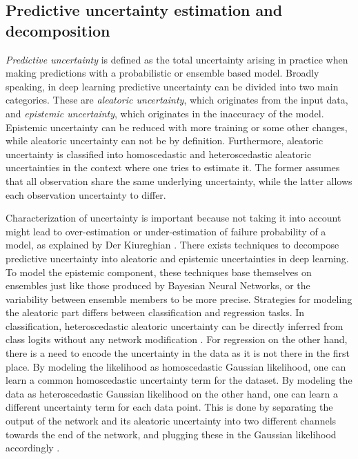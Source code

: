 \subsection{Predictive uncertainty estimation and decomposition}

\textit{Predictive uncertainty} is defined as the total uncertainty arising in practice when making predictions with a probabilistic or ensemble based model.
Broadly speaking, in deep learning predictive uncertainty can be divided into two main categories. These are  \textit{aleatoric uncertainty}, which originates from the input data, and \textit{epistemic uncertainty}, which originates in the inaccuracy of the model. Epistemic uncertainty can be reduced with more training or some other changes, while aleatoric uncertainty can not be by definition. Furthermore, aleatoric uncertainty is classified into homoscedastic and heteroscedastic aleatoric uncertainties in the context where one tries to estimate it. The former assumes that all observation share the same underlying uncertainty, while the latter allows each observation uncertainty to differ. \cite{shridhar_comprehensive_2019}

Characterization of uncertainty is important because not taking it into account might lead to over-estimation or under-estimation of failure probability of a model, as explained by Der Kiureghian \cite{kiureghian_aleatory_2009}. 
There exists techniques to decompose predictive uncertainty into aleatoric and epistemic uncertainties in deep learning. To model the epistemic component, these techniques base themselves on ensembles just like those produced by Bayesian Neural Networks, or the variability between ensemble members to be more precise. Strategies for modeling the aleatoric part differs between classification and regression tasks. In classification, heteroscedastic aleatoric uncertainty can be directly inferred from class logits without any network modification \cite{shridhar_comprehensive_2019, kwon_uncertainty_2020}. For regression on the other hand, there is a need to encode the uncertainty in the data as it is not there in the first place. By modeling the likelihood as homoscedastic Gaussian likelihood, one can learn a common homoscedastic uncertainty term for the dataset. By modeling the data as heteroscedastic Gaussian likelihood on the other hand, one can learn a different uncertainty term for each data point. This is done by separating the output of the network and its aleatoric uncertainty into two different channels towards the end of the network, and plugging these in the Gaussian likelihood accordingly \cite{kendall_what_2017}.

